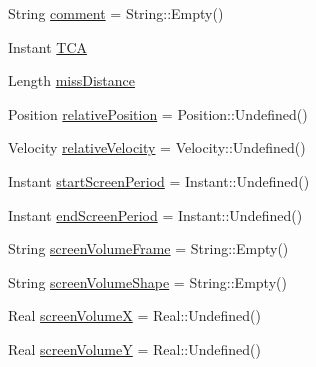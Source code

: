 \begin{DoxyCompactItemize}
\item 
String \hyperlink{structostk_1_1astro_1_1conjunction_1_1messages_1_1ccsds_1_1_c_d_m_1_1_relative_metadata_ab4c20facaf507c8968f1705ac09f67a5}{comment} = String\+::\+Empty()
\item 
Instant \hyperlink{structostk_1_1astro_1_1conjunction_1_1messages_1_1ccsds_1_1_c_d_m_1_1_relative_metadata_a5ff54bfc2f15a679244cc84cda3b5adc}{T\+CA}
\item 
Length \hyperlink{structostk_1_1astro_1_1conjunction_1_1messages_1_1ccsds_1_1_c_d_m_1_1_relative_metadata_a1196e463771c0f0199c4f54a1f1a05e7}{miss\+Distance}
\item 
Position \hyperlink{structostk_1_1astro_1_1conjunction_1_1messages_1_1ccsds_1_1_c_d_m_1_1_relative_metadata_a659e2e07a69047b7716bca49ff0d00f8}{relative\+Position} = Position\+::\+Undefined()
\item 
Velocity \hyperlink{structostk_1_1astro_1_1conjunction_1_1messages_1_1ccsds_1_1_c_d_m_1_1_relative_metadata_a2f1782200bd13c7a473769667a060870}{relative\+Velocity} = Velocity\+::\+Undefined()
\item 
Instant \hyperlink{structostk_1_1astro_1_1conjunction_1_1messages_1_1ccsds_1_1_c_d_m_1_1_relative_metadata_a41ed2de13d3990a54ee5184698e1df4a}{start\+Screen\+Period} = Instant\+::\+Undefined()
\item 
Instant \hyperlink{structostk_1_1astro_1_1conjunction_1_1messages_1_1ccsds_1_1_c_d_m_1_1_relative_metadata_a4131e67ee276fb8e09a814ef543dd7f0}{end\+Screen\+Period} = Instant\+::\+Undefined()
\item 
String \hyperlink{structostk_1_1astro_1_1conjunction_1_1messages_1_1ccsds_1_1_c_d_m_1_1_relative_metadata_aab6e00cedd6f308cdccf01d605659130}{screen\+Volume\+Frame} = String\+::\+Empty()
\item 
String \hyperlink{structostk_1_1astro_1_1conjunction_1_1messages_1_1ccsds_1_1_c_d_m_1_1_relative_metadata_a5c61458a82b76eb15898a9394921d540}{screen\+Volume\+Shape} = String\+::\+Empty()
\item 
Real \hyperlink{structostk_1_1astro_1_1conjunction_1_1messages_1_1ccsds_1_1_c_d_m_1_1_relative_metadata_a440c344301f3da0914287fc27efdecc3}{screen\+VolumeX} = Real\+::\+Undefined()
\item 
Real \hyperlink{structostk_1_1astro_1_1conjunction_1_1messages_1_1ccsds_1_1_c_d_m_1_1_relative_metadata_ac4af249795dd088566aad3eba225a140}{screen\+VolumeY} = Real\+::\+Undefined()
\item 

\end{DoxyCompactItemize}
